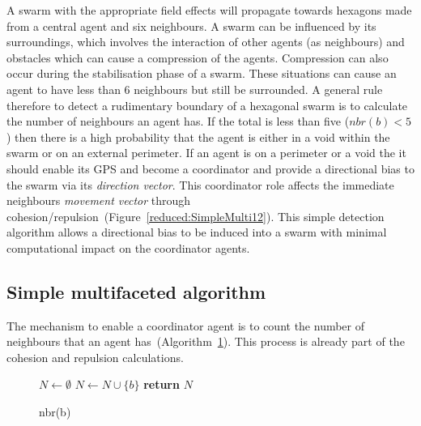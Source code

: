 \documentclass{ieeeaccess}
\begin{document}
A swarm with the appropriate field effects will propagate towards hexagons made from a central agent and six neighbours. A swarm can be influenced by its surroundings, which involves the interaction of other agents (as neighbours) and obstacles which can cause a compression of the agents. Compression can also occur during the stabilisation phase of a swarm. These situations can cause an agent to have less than 6 neighbours but still be surrounded. A general rule therefore to detect a rudimentary boundary of a hexagonal swarm is to calculate the number of neighbours an agent has. If the total is less than five ($nbr(b) < 5$) then there is a high probability that the agent is either in a void within the swarm or on an external perimeter. If an agent is on a perimeter or a void the it should enable its GPS and become a coordinator and provide a directional bias to the swarm via its \textit{direction vector}. This coordinator role affects the immediate neighbours \textit{movement vector} through cohesion/repulsion~(Figure~\ref{reduced:SimpleMulti12}). This simple detection algorithm allows a directional bias to be induced into a swarm with minimal computational impact on the coordinator agents.

\subsection{Simple multifaceted algorithm}
The mechanism to enable a coordinator agent is to count the number of neighbours that an agent has~(Algorithm~\ref{algo:neighbourDetect}). This process is already part of the cohesion and repulsion calculations.

\begin{figure}
\begin{algorithmic}[1]
\State $N \longleftarrow \emptyset$\;
     \State $N \longleftarrow N \cup \{b\}$
  \EndIf
\EndFor
\State\textbf{return} $N$
\EndProcedure
\end{algorithmic}
\caption[Neighbour Detection]{nbr(b)}
\label{algo:neighbourDetect}
\end{figure}
\end{document}
